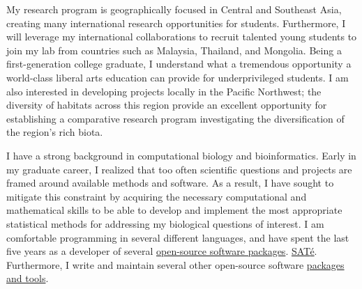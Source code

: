 \documentclass[letterpaper, 10pt]{letter}
\begin{document}
\begin{letter}
My research program is geographically focused in Central and Southeast Asia,
creating many international research opportunities for students.
Furthermore, I will leverage my international collaborations to recruit
talented young students to join my lab from countries such as Malaysia,
Thailand, and Mongolia.
Being a first-generation college graduate, I understand what a tremendous
opportunity a world-class liberal arts education can provide for
underprivileged students.
I am also interested in developing projects locally in the Pacific Northwest;
the diversity of habitats across this region provide an excellent opportunity
for establishing a comparative research program investigating the
diversification of the region's rich biota.


I have a strong background in computational biology and bioinformatics.
Early in my graduate career, I realized that too often scientific questions and
projects are framed around available methods and software.
As a result, I have sought to mitigate this constraint by acquiring the
necessary computational and mathematical skills to be able to develop and
implement the most appropriate statistical methods for addressing my biological
questions of interest.
I am comfortable programming in several different languages, and have spent the
last five years as a developer of several
\href{http://www.phyletica.com/?page_id=249}{open-source software packages}.
\href{http://phylo.bio.ku.edu/software/sate/sate.html}{{SAT}\'{e}}.
Furthermore, I write and maintain several other open-source software
\href{https://github.com/joaks1?tab=repositories}{packages and tools}.





\end{letter}
\end{document}
